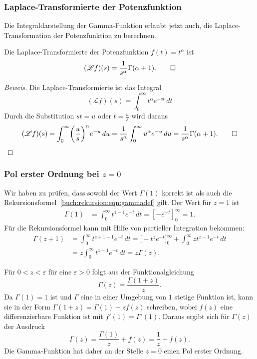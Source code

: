 \subsubsection{Laplace-Transformierte der Potenzfunktion}
Die Integraldarstellung der Gamma-Funktion erlaubt jetzt auch, die
Laplace-Transformation der Potenzfunktion zu berechnen.
%

\begin{satz}
Die Laplace-Transformierte der Potenzfunktion $f(t)=t^\alpha$ ist
\[
(\mathscr{L}f)(s)
=
\frac{1}{s^\alpha} \Gamma(\alpha+1).
\qedhere
\]
\end{satz}

\begin{proof}[Beweis]
Die Laplace-Transformierte ist das Integral
\[
(\mathscr{L}f)(s)
=
\int_0^\infty t^\alpha e^{-st}\,dt
\]
Durch die Substitution $st = u$ oder $t=\frac{u}{s}$ wird daraus
\[
(\mathscr{L}f)(s)
=
\int_0^\infty \biggl(\frac{u}{s}\biggr)^\alpha e^{-u}\,du
=
\frac{1}{s^\alpha}\int_0^\infty u^{\alpha} e^{-u}\,du
=
\frac{1}{s^\alpha} \Gamma(\alpha+1).
\qedhere
\]
\end{proof}

%
%
\subsubsection{Pol erster Ordnung bei $z=0$}
%
Wir haben zu prüfen, dass sowohl der Wert $\Gamma(1)$ korrekt ist als
auch die Rekursionsformel~\eqref{buch:rekursion:eqn:gammadef} gilt.
Der Wert für $z=1$ ist
\begin{align*}
\Gamma(1)
&=
\int_0^\infty t^{1-1}e^{-t}\,dt
=
\left[ -e^{-t} \right]_0^\infty
=
1.
\end{align*}
Für die Rekursionsformel kann mit Hilfe von partieller Integration
bekommen:
\begin{align*}
\Gamma(z+1)
&=
\int_0^\infty t^{z+1-1}e^{-t}\,dt
=
\biggl[-t^{z}e^{-t}\biggr]_0^\infty
+
\int_0^\infty z t^{z-1}e^{-t}\,dt
\\
&=
z
\int_0^\infty
t^{z-1}e^{-t}\,dt
=
z \Gamma(z).
\end{align*}

Für $0<z<\varepsilon$ für eine $\varepsilon >0$ folgt aus der 
Funktionalgleichung
\[
\Gamma(z) = \frac{\Gamma(1+z)}{z}.
\]
Da $\Gamma(1)=1$ ist und $\Gamma$ eine in einer
Umgebung von $1$ stetige Funktion ist, kann sie in der Form
\(
\Gamma(1+z)=\Gamma(1) + zf(z)
\)
schreiben, wobei  $f(z)$ eine differenzierbare Funktion ist mit
$f'(1)=\Gamma'(1)$.
Daraus ergibt sich für $\Gamma(z)$ der Ausdruck
\[
\Gamma(z) = \frac{\Gamma(1)}{z} + f(z) = \frac{1}{z} + f(z).
\]
Die Gamma-Funktion hat daher an der Stelle $z=0$ einen Pol erster Ordnung.

